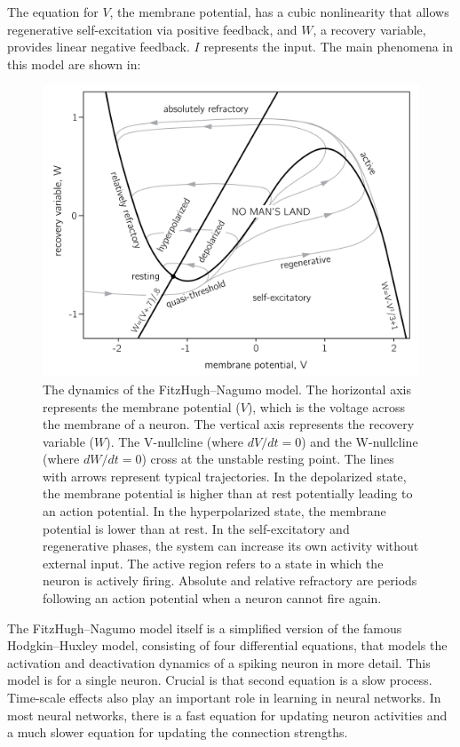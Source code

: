\documentclass[
  a4paper,
  DIV=11,
  numbers=noendperiod]{scrreprt}
\begin{document}
The equation for \(V\), the membrane potential, has a cubic nonlinearity
that allows regenerative self-excitation via positive feedback, and
\(W\), a recovery variable, provides linear negative feedback. \(I\)
represents the input. The main phenomena in this model are shown in:

\begin{figure}

{\centering \includegraphics{media/ch4n/ch4n-15__figure64.png}

}

\caption{\label{fig-ch4n-img15-old-63}The dynamics of the
FitzHugh--Nagumo model. The horizontal axis represents the membrane
potential (\(V\)), which is the voltage across the membrane of a neuron.
The vertical axis represents the recovery variable (\(W\)). The
V-nullcline (where \(dV/dt = 0\)) and the W-nullcline (where
\(dW/dt = 0\)) cross at the unstable resting point. The lines with
arrows represent typical trajectories. In the depolarized state, the
membrane potential is higher than at rest potentially leading to an
action potential. In the hyperpolarized state, the membrane potential is
lower than at rest. In the self-excitatory and regenerative phases, the
system can increase its own activity without external input. The active
region refers to a state in which the neuron is actively firing.
Absolute and relative refractory are periods following an action
potential when a neuron cannot fire again.}

\end{figure}

The FitzHugh--Nagumo model itself is a simplified version of the famous
Hodgkin--Huxley model, consisting of four differential equations, that
models the activation and deactivation dynamics of a spiking neuron in
more detail. This model is for a single neuron. Crucial is that second
equation is a slow process. Time-scale effects also play an important
role in learning in neural networks. In most neural networks, there is a
fast equation for updating neuron activities and a much slower equation
for updating the connection strengths.
\end{document}
